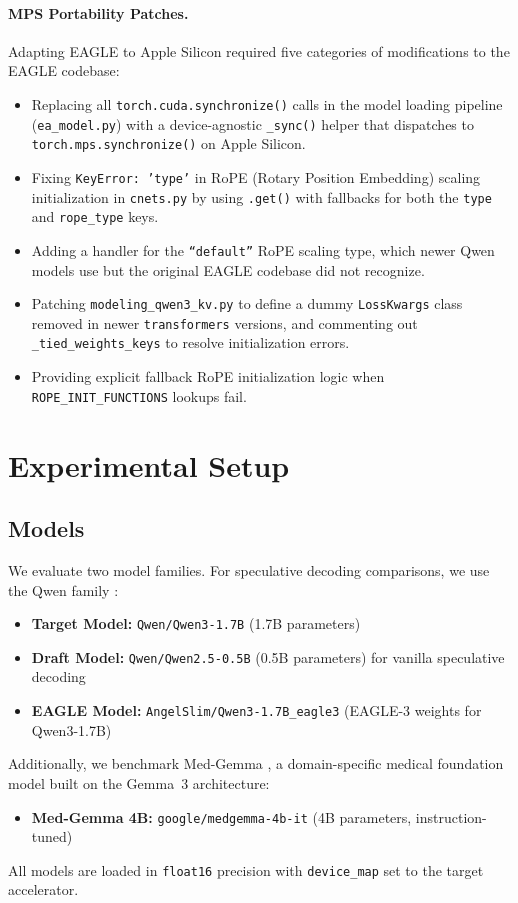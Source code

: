 \documentclass[11pt]{article}
\begin{document}
\paragraph{MPS Portability Patches.}
Adapting EAGLE to Apple Silicon required five categories of modifications to the EAGLE codebase:
\begin{itemize}
    \item Replacing all \texttt{torch.cuda.synchronize()} calls in the model loading pipeline (\texttt{ea\_model.py}) with a device-agnostic \texttt{\_sync()} helper that dispatches to \texttt{torch.mps.synchronize()} on Apple Silicon.
    \item Fixing \texttt{KeyError: 'type'} in RoPE (Rotary Position Embedding) scaling initialization in \texttt{cnets.py} by using \texttt{.get()} with fallbacks for both the \texttt{type} and \texttt{rope\_type} keys.
    \item Adding a handler for the \texttt{``default''} RoPE scaling type, which newer Qwen models use but the original EAGLE codebase did not recognize.
    \item Patching \texttt{modeling\_qwen3\_kv.py} to define a dummy \texttt{LossKwargs} class removed in newer \texttt{transformers} versions, and commenting out \texttt{\_tied\_weights\_keys} to resolve initialization errors.
    \item Providing explicit fallback RoPE initialization logic when \texttt{ROPE\_INIT\_FUNCTIONS} lookups fail.
\end{itemize}

\section{Experimental Setup}

\subsection{Models}
We evaluate two model families. For speculative decoding comparisons, we use the Qwen family \citep{qwen2024}:
\begin{itemize}
    \item \textbf{Target Model:} \texttt{Qwen/Qwen3-1.7B} (1.7B parameters)
    \item \textbf{Draft Model:} \texttt{Qwen/Qwen2.5-0.5B} (0.5B parameters) for vanilla speculative decoding
    \item \textbf{EAGLE Model:} \texttt{AngelSlim/Qwen3-1.7B\_eagle3} (EAGLE-3 weights for Qwen3-1.7B)
\end{itemize}
Additionally, we benchmark Med-Gemma \citep{medgemma2024}, a domain-specific medical foundation model built on the Gemma~3 architecture:
\begin{itemize}
    \item \textbf{Med-Gemma 4B:} \texttt{google/medgemma-4b-it} (4B parameters, instruction-tuned)
\end{itemize}
All models are loaded in \texttt{float16} precision with \texttt{device\_map} set to the target accelerator.
\end{document}
